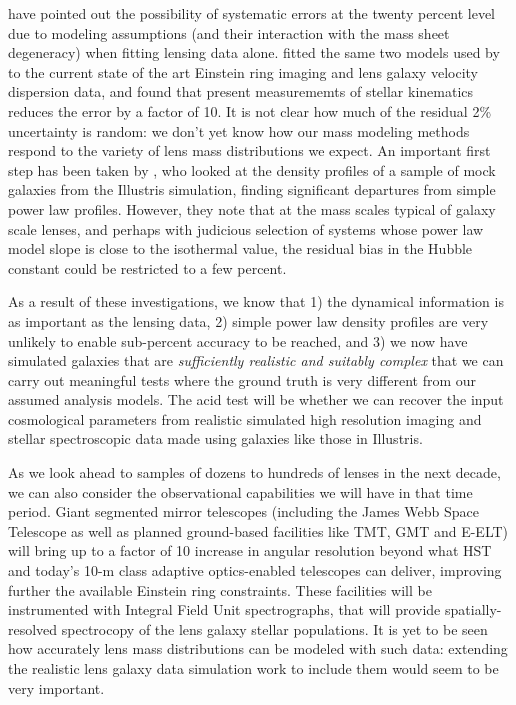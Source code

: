 \citet{S+S13} have pointed out the possibility of systematic errors at
the twenty percent level due to modeling assumptions (and their
interaction with the mass sheet degeneracy) when  fitting lensing data
alone.   \citet{Suy++14} fitted the same two models used by
\citet{S+S13}  to the current state of the art Einstein ring imaging and
lens galaxy velocity dispersion data,  and found that present
measurememts of stellar kinematics reduces the error by a factor of 10.
It is not clear  how much of the residual 2\% uncertainty is random: we
don't yet know  how our mass modeling methods respond to the variety of
lens mass  distributions we expect. An important first step has been
taken by  \citet{XuEtal2016}, who looked at the density profiles of a
sample of mock galaxies from the Illustris simulation, finding
significant departures from simple power law profiles. However, they
note that at the mass scales  typical of galaxy scale lenses, and
perhaps with judicious selection of systems whose power law model slope
is close to the isothermal value,  the residual bias in the Hubble
constant could be restricted to a few percent.

As a result of these investigations, we know that 1) the dynamical
information is as important as the lensing data, 2) simple power law
density profiles are very unlikely to enable sub-percent accuracy to be
reached, and 3) we now have simulated galaxies that are {\it
sufficiently realistic and suitably complex} that we can carry out
meaningful tests where the ground truth is  very different from our
assumed analysis models. The acid test will be whether we can recover
the input cosmological parameters  from realistic simulated high
resolution imaging and stellar spectroscopic data made using galaxies
like those in Illustris.

As we look ahead to samples of dozens to hundreds of lenses in the next
decade,  we can also consider the observational capabilities we will
have in that time period. Giant segmented mirror telescopes (including
the James Webb Space Telescope as well as planned ground-based
facilities like TMT, GMT and E-ELT) will bring up to a factor of 10
increase in angular resolution beyond what HST and today's 10-m class
adaptive optics-enabled telescopes can deliver, improving  further the
available Einstein ring constraints. These facilities will  be
instrumented with Integral Field Unit spectrographs, that will  provide
spatially-resolved spectrocopy of the lens galaxy stellar populations.
It is yet to be seen how accurately lens mass distributions can be modeled with
such data: extending the realistic lens galaxy data simulation work to include
them would seem to be very important.


